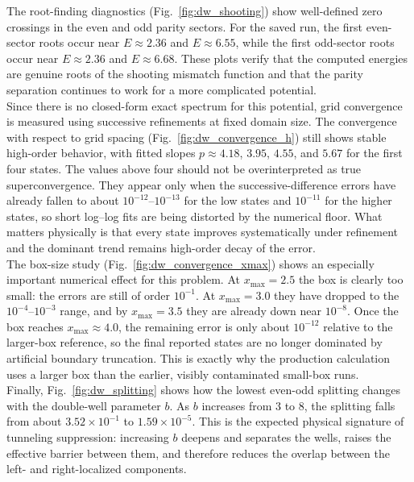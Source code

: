 \documentclass[11pt]{article}
\begin{document}
\begin{refsection}
            The root-finding diagnostics (Fig.~\ref{fig:dw_shooting}) show well-defined zero crossings in the even and odd parity sectors. For the saved run, the first even-sector roots occur near $E\approx2.36$ and $E\approx6.55$, while the first odd-sector roots occur near $E\approx2.36$ and $E\approx6.68$. These plots verify that the computed energies are genuine roots of the shooting mismatch function and that the parity separation continues to work for a more complicated potential. \\

            Since there is no closed-form exact spectrum for this potential, grid convergence is measured using successive refinements at fixed domain size. The convergence with respect to grid spacing (Fig.~\ref{fig:dw_convergence_h}) still shows stable high-order behavior, with fitted slopes $p\approx4.18$, $3.95$, $4.55$, and $5.67$ for the first four states. The values above four should not be overinterpreted as true superconvergence. They appear only when the successive-difference errors have already fallen to about $10^{-12}$--$10^{-13}$ for the low states and $10^{-11}$ for the higher states, so short log--log fits are being distorted by the numerical floor. What matters physically is that every state improves systematically under refinement and the dominant trend remains high-order decay of the error. \\

            The box-size study (Fig.~\ref{fig:dw_convergence_xmax}) shows an especially important numerical effect for this problem. At $x_{\max}=2.5$ the box is clearly too small: the errors are still of order $10^{-1}$. At $x_{\max}=3.0$ they have dropped to the $10^{-4}$--$10^{-3}$ range, and by $x_{\max}=3.5$ they are already down near $10^{-8}$. Once the box reaches $x_{\max}\approx4.0$, the remaining error is only about $10^{-12}$ relative to the larger-box reference, so the final reported states are no longer dominated by artificial boundary truncation. This is exactly why the production calculation uses a larger box than the earlier, visibly contaminated small-box runs. \\

            Finally, Fig.~\ref{fig:dw_splitting} shows how the lowest even-odd splitting changes with the double-well parameter $b$. As $b$ increases from $3$ to $8$, the splitting falls from about $3.52\times10^{-1}$ to $1.59\times10^{-5}$. This is the expected physical signature of tunneling suppression: increasing $b$ deepens and separates the wells, raises the effective barrier between them, and therefore reduces the overlap between the left- and right-localized components. \\


\end{refsection}
\end{document}
